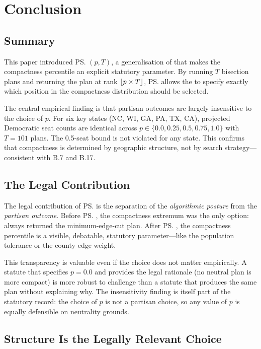 \section{Conclusion}
\label{sec:conclusion}

\subsection{Summary}

This paper introduced \ps{}$(p, T)$, a generalisation of \cs{} that makes
the compactness percentile an explicit statutory parameter.
By running $T$ bisection plans and returning the plan at rank $\lfloor p
\times T \rfloor$, \ps{} allows the \dia{} to specify exactly which position in
the compactness distribution should be selected.

The central empirical finding is that partisan outcomes are largely
insensitive to the choice of $p$.
For six key states (NC, WI, GA, PA, TX, CA), projected Democratic seat counts
are identical across $p \in \{0.0, 0.25, 0.5, 0.75, 1.0\}$ with $T = 101$
plans.
The 0.5-seat bound is not violated for any state.
This confirms that compactness is determined by geographic structure, not by
search strategy---consistent with B.7 and B.17.

\subsection{The Legal Contribution}

The legal contribution of \ps{} is the separation of the \emph{algorithmic
posture} from the \emph{partisan outcome}.
Before \ps{}, the compactness extremum was the only option: \cs{} always
returned the minimum-edge-cut plan.
After \ps{}, the compactness percentile is a visible, debatable, statutory
parameter---like the population tolerance or the county edge weight.

This transparency is valuable even if the choice does not matter empirically.
A statute that specifies $p = 0.0$ and provides the legal rationale (no
neutral plan is more compact) is more robust to challenge than a statute
that produces the same plan without explaining why.
The insensitivity finding is itself part of the statutory record: the choice
of $p$ is not a partisan choice, so any value of $p$ is equally defensible
on neutrality grounds.

\subsection{Structure Is the Legally Relevant Choice}

